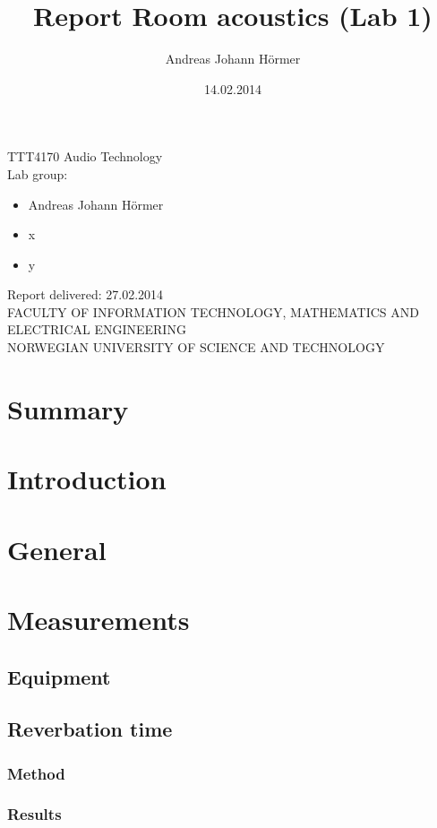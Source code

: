 \documentclass{article}
\title{Report Room acoustics (Lab 1)}
\author{Andreas Johann H\"ormer}
\date{14.02.2014}
\begin{document}
\maketitle
\begin{center}
TTT4170 Audio Technology\\[3cm]
Lab group:
\begin{itemize}
\item Andreas Johann H\"ormer
\item x
\item y\\[3cm]
\end{itemize}
Report delivered: 27.02.2014\\[6cm]
FACULTY OF INFORMATION TECHNOLOGY, MATHEMATICS AND ELECTRICAL ENGINEERING\\
NORWEGIAN UNIVERSITY OF SCIENCE AND TECHNOLOGY
\end{center}

\newpage
\section{Summary}

\newpage
\section{Introduction}

\newpage
\section{General}

\newpage
\section{Measurements}
\subsection{Equipment}
\subsection{Reverbation time}
\subsubsection{Method}
\subsubsection{Results}
\end{document}
